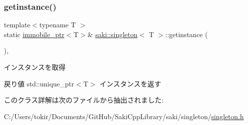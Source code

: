 \subsubsection{\texorpdfstring{getinstance()}{getinstance()}}
{\footnotesize\ttfamily template$<$typename T $>$ \\
static \mbox{\hyperlink{classsaki_1_1immobile__ptr}{immobile\+\_\+ptr}}$<$T$>$\& \mbox{\hyperlink{classsaki_1_1singleton}{saki\+::singleton}}$<$ T $>$\+::getinstance (\begin{DoxyParamCaption}{ }\end{DoxyParamCaption})\hspace{0.3cm}{\ttfamily [inline]}, {\ttfamily [static]}}



インスタンスを取得 

\begin{DoxyReturn}{戻り値}
std\+::unique\+\_\+ptr$<$\+T$>$ インスタンスを返す 
\end{DoxyReturn}


このクラス詳解は次のファイルから抽出されました\+:\begin{DoxyCompactItemize}
\item 
C\+:/\+Users/tokir/\+Documents/\+Git\+Hub/\+Saki\+Cpp\+Library/saki/singleton/\mbox{\hyperlink{singleton_8h}{singleton.\+h}}\end{DoxyCompactItemize}
